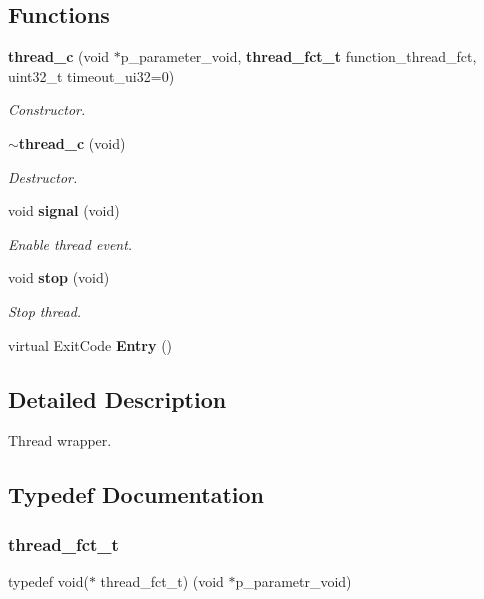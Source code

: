 \subsection*{Functions}
\begin{DoxyCompactItemize}
\item 
\textbf{ thread\+\_\+c} (void $\ast$p\+\_\+parameter\+\_\+void, \textbf{ thread\+\_\+fct\+\_\+t} function\+\_\+thread\+\_\+fct, uint32\+\_\+t timeout\+\_\+ui32=0)
\begin{DoxyCompactList}\small\item\em Constructor. \end{DoxyCompactList}\item 
\textbf{ $\sim$thread\+\_\+c} (void)
\begin{DoxyCompactList}\small\item\em Destructor. \end{DoxyCompactList}\item 
void \textbf{ signal} (void)
\begin{DoxyCompactList}\small\item\em Enable thread event. \end{DoxyCompactList}\item 
void \textbf{ stop} (void)
\begin{DoxyCompactList}\small\item\em Stop thread. \end{DoxyCompactList}\item 
virtual Exit\+Code \textbf{ Entry} ()
\end{DoxyCompactItemize}


\subsection{Detailed Description}
Thread wrapper. 



\subsection{Typedef Documentation}
\mbox{\label{group___thread_ga7cb6c85fe4a6993e52fcbc5cb79dca16}} 
\subsubsection{thread\_fct\_t}
{\footnotesize\ttfamily typedef void($\ast$ thread\+\_\+fct\+\_\+t) (void $\ast$p\+\_\+parametr\+\_\+void)}

